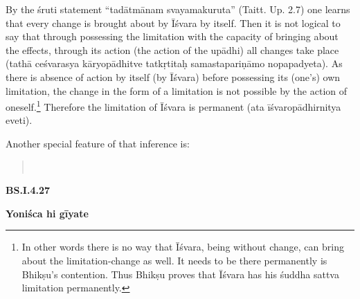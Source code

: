 By the śruti statement “tadātmānam svayamakuruta” (Taitt. Up. 2.7) one learns that every change is brought about by Īśvara by itself. Then it is not logical to say that through possessing the limitation with the capacity of bringing about the effects, through its action (the action of the upādhi) all changes take place (tathā ceśvarasya kāryopādhitve tatkṛtitaḥ samastapariṇāmo nopapadyeta). As there is absence of action by itself (by Īśvara) before possessing its (one’s) own limitation, the change in the form of a limitation is not possible by the action of oneself.\footnote{In other words there is no way that Īśvara, being without change, can bring about the limitation-change  as well. It needs to be there permanently is Bhikṣu’s contention. Thus Bhikṣu proves that Īśvara has his śuddha sattva limitation permanently.} Therefore the limitation of Īśvara is permanent (ata īśvaropādhirnitya eveti).

Another special feature of that inference is:

\textbf{}


\begin{verse}
\\
\end{verse}


\textbf{BS.I.4.27}

\textbf{Yoniśca hi gīyate}

